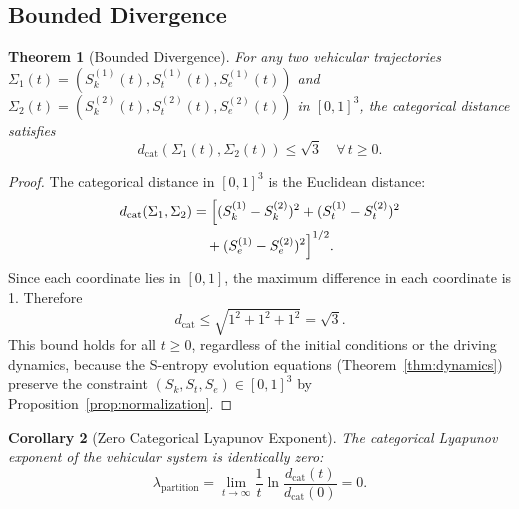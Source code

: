 \documentclass[twocolumn,10pt]{article}
\newtheorem{theorem}{Theorem}[section]
\newtheorem{corollary}[theorem]{Corollary}
\newcommand{\Sk}{S_k}
\newcommand{\St}{S_t}
\newcommand{\Se}{S_e}
\begin{document}
\subsection{Bounded Divergence}

\begin{theorem}[Bounded Divergence]\label{thm:bounded_div}
For any two vehicular trajectories $\Sigma_1(t) = (\Sk^{(1)}(t), \St^{(1)}(t), \Se^{(1)}(t))$ and $\Sigma_2(t) = (\Sk^{(2)}(t), \St^{(2)}(t), \Se^{(2)}(t))$ in $[0,1]^3$, the categorical distance satisfies
\begin{equation}\label{eq:bounded_div}
d_{\mathrm{cat}}(\Sigma_1(t), \Sigma_2(t)) \leq \sqrt{3} \quad \forall\, t \geq 0.
\end{equation}
\end{theorem}

\begin{proof}
The categorical distance in $[0,1]^3$ is the Euclidean distance:
\begin{align}
d_{\mathrm{cat}}(\Sigma_1, \Sigma_2) &= \Bigl[(\Sk^{(1)} - \Sk^{(2)})^2 + (\St^{(1)} - \St^{(2)})^2 \nonumber\\
&\quad + (\Se^{(1)} - \Se^{(2)})^2\Bigr]^{1/2}.
\end{align}
Since each coordinate lies in $[0,1]$, the maximum difference in each coordinate is 1. Therefore
\begin{equation}
d_{\mathrm{cat}} \leq \sqrt{1^2 + 1^2 + 1^2} = \sqrt{3}.
\end{equation}
This bound holds for all $t \geq 0$, regardless of the initial conditions or the driving dynamics, because the S-entropy evolution equations (Theorem~\ref{thm:dynamics}) preserve the constraint $(\Sk, \St, \Se) \in [0,1]^3$ by Proposition~\ref{prop:normalization}.
\end{proof}

\begin{corollary}[Zero Categorical Lyapunov Exponent]\label{cor:lyapunov}
The categorical Lyapunov exponent of the vehicular system is identically zero:
\begin{equation}\label{eq:lyapunov}
\lambda_{\mathrm{partition}} = \lim_{t \to \infty} \frac{1}{t} \ln \frac{d_{\mathrm{cat}}(t)}{d_{\mathrm{cat}}(0)} = 0.
\end{equation}
\end{corollary}
\end{document}

